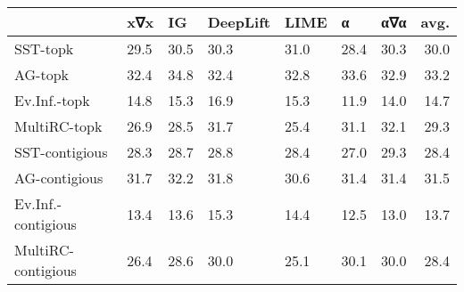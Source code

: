 \begin{tabular}{lllllllr}
\toprule
{} &   x∇x &    IG & DeepLift &  LIME &     α &   α∇α &  avg. \\
\midrule
SST-topk           &  29.5 &  30.5 &     30.3 &  31.0 &  28.4 &  30.3 &  30.0 \\
AG-topk            &  32.4 &  34.8 &     32.4 &  32.8 &  33.6 &  32.9 &  33.2 \\
Ev.Inf.-topk       &  14.8 &  15.3 &     16.9 &  15.3 &  11.9 &  14.0 &  14.7 \\
MultiRC-topk       &  26.9 &  28.5 &     31.7 &  25.4 &  31.1 &  32.1 &  29.3 \\
SST-contigious     &  28.3 &  28.7 &     28.8 &  28.4 &  27.0 &  29.3 &  28.4 \\
AG-contigious      &  31.7 &  32.2 &     31.8 &  30.6 &  31.4 &  31.4 &  31.5 \\
Ev.Inf.-contigious &  13.4 &  13.6 &     15.3 &  14.4 &  12.5 &  13.0 &  13.7 \\
MultiRC-contigious &  26.4 &  28.6 &     30.0 &  25.1 &  30.1 &  30.0 &  28.4 \\
\bottomrule
\end{tabular}
